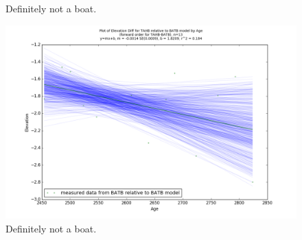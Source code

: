 \documentclass{article}
\begin{document}
\begin{figure}[h]
	\caption{Definitely not a boat.}
	\label{fig:data_TAHBxBATB}
\end{figure}
\newpage

\begin{figure}[h]
	\includegraphics[width=\linewidth]{data/gias/theGIA_TAHB_relative_to_BATB.png}
	\caption{Definitely not a boat.}
	\label{fig:gias_TAHBxBATB}
\end{figure}
\newpage
\end{document}

